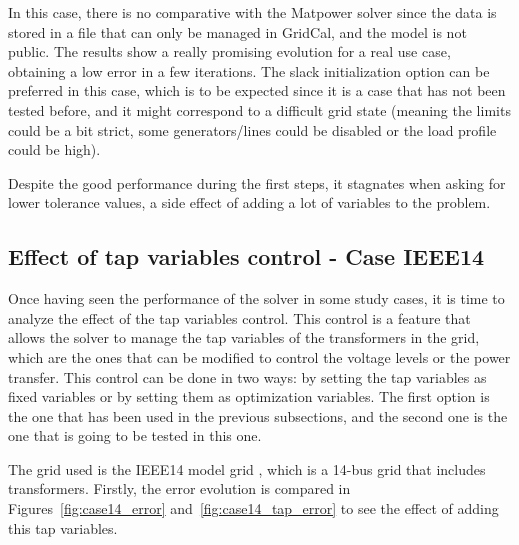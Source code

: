 In this case, there is no comparative with the Matpower solver since the data is stored in a file that can only be managed in GridCal, and the model is not public. The results show a really promising evolution for a real use case,
obtaining a low error in a few iterations. The slack initialization option can be preferred in this case, which is to be expected since it is a case that has not been tested before, and it might correspond 
to a difficult grid state (meaning the limits could be a bit strict, some generators/lines could be disabled or the load profile could be high).

Despite the good performance during the first steps, it stagnates when asking for lower tolerance values, a side effect of adding a lot of variables to the problem.


\subsection{Effect of tap variables control - Case IEEE14}

Once having seen the performance of the solver in some study cases, it is time to analyze the effect of the tap variables control. This control is a feature that allows the solver to manage the tap variables of the transformers in the grid, 
which are the ones that can be modified to control the voltage levels or the power transfer. This control can be done in two ways: by setting the tap variables as fixed variables or by setting them as optimization variables. The first option is the one 
that has been used in the previous subsections, and the second one is the one that is going to be tested in this one.

The grid used is the IEEE14 model grid \cite{dabbagchi1993power}, which is a 14-bus grid that includes transformers. Firstly, the error evolution is compared in Figures~\ref{fig:case14_error} and~\ref{fig:case14_tap_error} to see the effect of adding this tap variables. 


